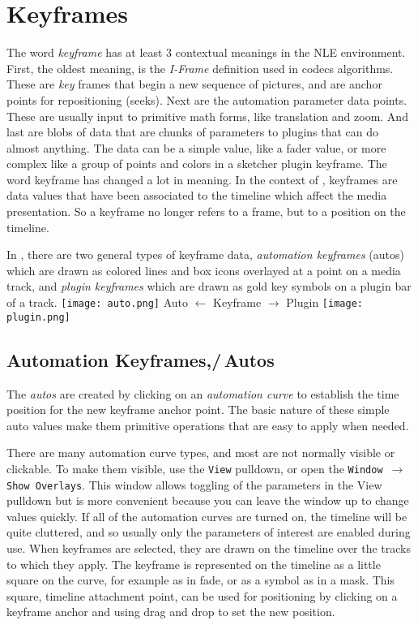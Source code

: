 \chapter{Keyframes}%
\label{cha:keyframes}

The word \textit{keyframe} has at least 3 contextual meanings in the NLE environment.  First, the oldest meaning, is the \textit{I-Frame} definition used in codecs algorithms.  These are \textit{key} frames that begin a new sequence of pictures, and are anchor points for repositioning (seeks).  Next are the automation parameter data points.  These are usually input to primitive math forms, like translation and zoom.  And last are blobs of data that are chunks of parameters to plugins that can do almost anything.  The data can be a simple value, like a fader value, or more complex like a group of points and colors in a sketcher plugin keyframe.  The word keyframe has changed a lot in meaning.  In the context of \CGG{}, keyframes are data values that have been associated to the timeline which affect the media presentation.  So a keyframe no longer refers to a frame, but to a position on the timeline.

In \CGG{}, there are two general types of keyframe data,
\textit{automation keyframes} (autos) which are drawn as colored
lines and box icons overlayed at a point on a media track, and
\textit{plugin keyframes} which are drawn as gold key symbols on a
plugin bar of a
track. \texttt{[image: auto.png]} Auto
$\leftarrow$ Keyframe $\rightarrow$ Plugin
\texttt{[image: plugin.png]}

\section{Automation Keyframes,/\,Autos}%
\label{sec:automation_keyframes_autos}

The \textit{autos} are created by clicking on an \textit{automation curve} to establish the time position for the new keyframe anchor point.  The basic nature of these simple auto values make them primitive operations that are easy to apply when needed.

There are many automation curve types, and most are not normally visible or clickable.  To make them visible, use the \texttt{View} pulldown, or open the \texttt{Window $\rightarrow$ Show Overlays}. This window allows toggling of the parameters in the View pulldown but is more convenient because you can leave the window up to change values quickly.  If all of the automation curves are turned on, the timeline will be quite cluttered, and so usually only the parameters of interest are enabled during use.  When keyframes are selected, they are drawn on the timeline over the tracks to which they apply.  The keyframe is represented on the timeline as a little square on the curve, for example as in fade, or as a symbol as in a mask.  This square, timeline attachment point, can be used for positioning by clicking on a keyframe anchor and using drag and drop to set the new position.

